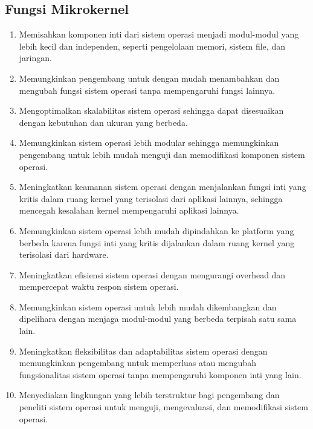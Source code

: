 \subsection{Fungsi Mikrokernel}
\begin{enumerate}
	\item Memisahkan komponen inti dari sistem operasi menjadi modul-modul yang lebih kecil dan independen, seperti pengelolaan memori, sistem file, dan jaringan.
	
	\item Memungkinkan pengembang untuk dengan mudah menambahkan dan mengubah fungsi sistem operasi tanpa mempengaruhi fungsi lainnya.
	
	\item Mengoptimalkan skalabilitas sistem operasi sehingga dapat disesuaikan dengan kebutuhan dan ukuran yang berbeda.
	
	\item Memungkinkan sistem operasi lebih modular sehingga memungkinkan pengembang untuk lebih mudah menguji dan memodifikasi komponen sistem operasi.
	
	\item Meningkatkan keamanan sistem operasi dengan menjalankan fungsi inti yang kritis dalam ruang kernel yang terisolasi dari aplikasi lainnya, sehingga mencegah kesalahan kernel mempengaruhi aplikasi lainnya.
	
	\item Memungkinkan sistem operasi lebih mudah dipindahkan ke platform yang berbeda karena fungsi inti yang kritis dijalankan dalam ruang kernel yang terisolasi dari hardware.
	
	\item Meningkatkan efisiensi sistem operasi dengan mengurangi overhead dan mempercepat waktu respon sistem operasi.
	
	\item Memungkinkan sistem operasi untuk lebih mudah dikembangkan dan dipelihara dengan menjaga modul-modul yang berbeda terpisah satu sama lain.
	
	\item Meningkatkan fleksibilitas dan adaptabilitas sistem operasi dengan memungkinkan pengembang untuk memperluas atau mengubah fungsionalitas sistem operasi tanpa mempengaruhi komponen inti yang lain.
	
	\item Menyediakan lingkungan yang lebih terstruktur bagi pengembang dan peneliti sistem operasi untuk menguji, mengevaluasi, dan memodifikasi sistem operasi.
\end{enumerate}

